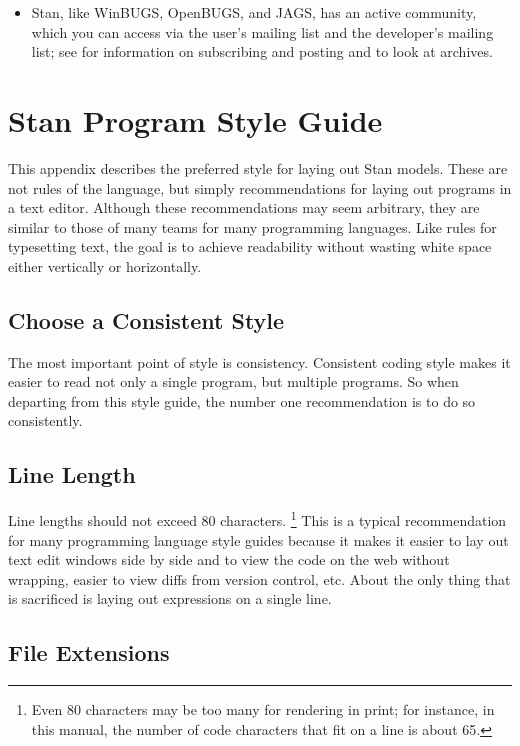 \begin{itemize}
\item Stan, like WinBUGS, OpenBUGS, and JAGS, has an active community,
  which you can access via the user's mailing list and the developer's
  mailing list; see  for information on
  subscribing and posting and to look at archives.
\end{itemize}


\chapter{Stan Program Style Guide}

\noindent
This appendix describes the preferred style for laying out Stan
models. These are not rules of the language, but simply
recommendations for laying out programs in a text editor.  Although
these recommendations may seem arbitrary, they are similar to those of
many teams for many programming languages.  Like rules for typesetting
text, the goal is to achieve readability without wasting white space
either vertically or horizontally.

\section{Choose a Consistent Style}

The most important point of style is consistency.  Consistent coding
style makes it easier to read not only a single program, but multiple
programs.  So when departing from this style guide, the number one
recommendation is to do so consistently.

\section{Line Length}

Line lengths should not exceed 80 characters.%
%
\footnote{Even 80 characters may be too many for rendering in print;
  for instance, in this manual, the number of code characters that fit
  on a line is about 65.}
%
This is a typical recommendation for many programming language style
guides because it makes it easier to lay out text edit windows side by
side and to view the code on the web without wrapping, easier to view
diffs from version control, etc.  About the only thing that is
sacrificed is laying out expressions on a single line.

\section{File Extensions}


